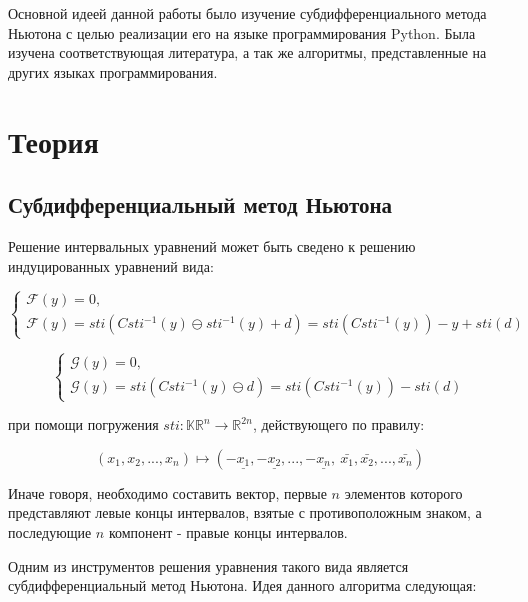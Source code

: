 \documentclass{article}
\begin{document}
Основной идеей данной работы было изучение субдифференциального метода Ньютона с целью реализации его на языке программирования Python. Была изучена соответствующая литература, а так же алгоритмы, представленные на других языках программирования. 

\section{Теория}

\subsection{Субдифференциальный метод Ньютона}

Решение интервальных уравнений может быть сведено к решению индуцированных уравнений вида:

\begin{equation}
 \begin{cases}
 \mathcal{F}(y) = 0, \\
 \mathcal{F}(y) = sti(Csti^{-1}(y) \ominus sti^{-1}(y) + d) = sti(Csti^{-1}(y)) - y + sti(d)
 \end{cases}
\end{equation}

\begin{equation}
 \begin{cases}
 \mathcal{G}(y) = 0, \\
 \mathcal{G}(y) = sti(Csti^{-1}(y) \ominus d) = sti(Csti^{-1}(y)) - sti(d)
 \end{cases}
\end{equation}

при помощи погружения $sti:\mathbb{KR}^n \to \mathbb{R}^{2n}$, действующего по правилу:

\begin{equation}
(x_1, x_2, ... , x_n) \mapsto (-\underline{x_1}, -\underline{x_2}, ... , -\underline{x_n}, \ 
                              \bar{x_1}, \bar{x_2}, ... , \bar{x_n}) 
\end{equation}

Иначе говоря, необходимо составить вектор, первые $n$ элементов которого представляют левые концы интервалов, взятые с противоположным знаком, а последующие $n$ компонент - правые концы интервалов.

Одним из инструментов решения уравнения такого вида является субдифференциальный метод Ньютона. Идея данного алгоритма следующая:
\end{document}
